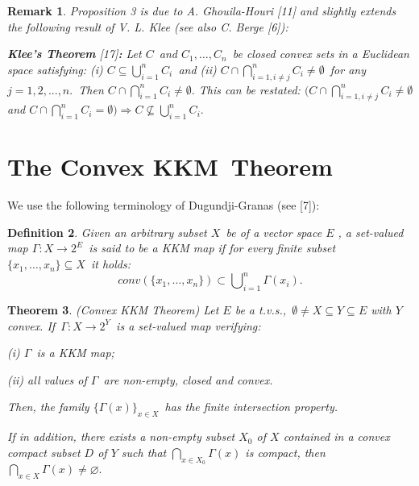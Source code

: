 \documentclass{article}
\newtheorem{theorem}{Theorem}
\newtheorem{definition}[theorem]{Definition}
\newtheorem{remark}[theorem]{Remark}
\begin{document}
\begin{remark}
Proposition 3 is due to A. Ghouila-Houri [11] and slightly extends the
following result of V. L. Klee (see also C. Berge [6]):

\textbf{Klee's Theorem }[17]\textbf{: }\textit{Let }$C$\textit{\ and }$%
C_{1},\ldots ,C_{n}$\textit{\ be closed convex sets in a Euclidean space
satisfying: (i) }$C\subseteq \bigcup_{i=1}^{n}C_{i}$\textit{\ and (ii) }$%
C\cap \bigcap_{i=1,i\neq j}^{n}C_{i}\neq \emptyset $\textit{\ for any }$%
j=1,2,...,n.$\textit{\ Then }$C\cap \bigcap_{i=1}^{n}C_{i}\neq \emptyset .$
This can be restated: $(C\cap \bigcap_{i=1,i\neq j}^{n}C_{i}\neq \emptyset $
and $C\cap \bigcap_{i=1}^{n}C_{i}=\emptyset )\Longrightarrow C\nsubseteq
\bigcup_{i=1}^{n}C_{i}.$
\end{remark}

\section{The Convex KKM\ Theorem}

We use the following terminology of Dugundji-Granas (see [7]):\bigskip

\begin{definition}
\textit{Given an arbitrary subset }$X$\textit{\ be of a vector space }$E$%
\textit{, a set-valued map }$\Gamma :X\longrightarrow 2^{E}$\textit{\ is
said to be a KKM map if for every finite subset }$\{x_{1},\ldots
,x_{n}\}\subseteq X$\textit{\ it holds:}%
\begin{equation*}
conv(\{x_{1},\ldots ,x_{n}\})\subset \bigcup\nolimits_{i=1}^{n}\Gamma
(x_{i}).
\end{equation*}%
\bigskip
\end{definition}

\begin{theorem}
(Convex KKM Theorem) \textit{Let }$E$ be a t.v.s.,\textit{\ }$\emptyset \neq
X\subseteq Y\subseteq E$ with $Y$ convex. If\textit{\ }$\Gamma
:X\longrightarrow 2^{Y}$\textit{\ is a set-valued map verifying:}

\textit{(i) }$\Gamma $\textit{\ is a KKM map;}

\textit{(ii) all values of }$\Gamma $\textit{\ are non-empty, closed and
convex.}

\textit{Then, the family }$\{\Gamma (x)\}_{x\in X}$\textit{\ has the finite
intersection property.}

\textit{If in addition, there exists a non-empty subset }$X_{0}$ of $X$
contained in a convex compact subset $D$ of $Y$ such that $\bigcap_{x\in
X_{0}}\Gamma (x)$ \textit{is compact, then }$\bigcap_{x\in X}\Gamma (x)\neq
\varnothing .$\bigskip
\end{theorem}
\end{document}
